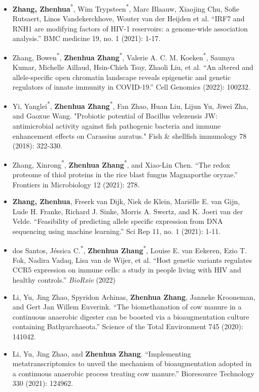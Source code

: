 \documentclass[10pt,A4,english]{article}
\begin{document}
\begin{paracol}{2}
\begin{rightcolumn}
\begin{itemize}[leftmargin=*]
  \item \textbf{Zhang, Zhenhua}\textsuperscript{*}, Wim Trypsteen\textsuperscript{*}, Marc Blaauw, Xiaojing Chu, Sofie Rutsaert, Linos Vandekerckhove, Wouter van der Heijden et al. \enquote{IRF7 and RNH1 are modifying factors of HIV-1 reservoirs: a genome-wide association analysis.} BMC medicine 19, no. 1 (2021): 1-17.
  \item Zhang, Bowen\textsuperscript{*}, \textbf{Zhenhua Zhang}\textsuperscript{*}, Valerie A. C. M. Koeken\textsuperscript{*}, Saumya Kumar, Michelle Aillaud, Hsin-Chieh Tsay, Zhaoli Liu, et al. \enquote{An altered and allele-specific open chromatin landscape reveals epigenetic and genetic regulators of innate immunity in COVID-19.} Cell Genomics (2022): 100232.
  \item Yi, Yanglei\textsuperscript{*}, \textbf{Zhenhua Zhang}\textsuperscript{*}, Fan Zhao, Huan Liu, Lijun Yu, Jiwei Zha, and Gaoxue Wang. "Probiotic potential of Bacillus velezensis JW: antimicrobial activity against fish pathogenic bacteria and immune enhancement effects on Carassius auratus." Fish \& shellfish immunology 78 (2018): 322-330.
  \item Zhang, Xinrong\textsuperscript{*}, \textbf{Zhenhua Zhang}\textsuperscript{*}, and Xiao-Lin Chen. \enquote{The redox proteome of thiol proteins in the rice blast fungus Magnaporthe oryzae.} Frontiers in Microbiology 12 (2021): 278.
  \item \textbf{Zhang, Zhenhua}, Freerk van Dijk, Niek de Klein, Mariëlle E. van Gijn, Lude H. Franke, Richard J. Sinke, Morris A. Swertz, and K. Joeri van der Velde. \enquote{Feasibility of predicting allele specific expression from DNA sequencing using machine learning.} Sci Rep 11, no. 1 (2021): 1-11.
  \item dos Santos, Jéssica C.\textsuperscript{*}, \textbf{Zhenhua Zhang}\textsuperscript{*}, Louise E. van Eekeren, Ezio T. Fok, Nadira Vadaq, Lisa van de Wijer, et al. \enquote{Host genetic variants regulates CCR5 expression on immune cells: a study in people living with HIV and healthy controls.} \textit{BioRxiv} (2022)
  \item Li, Yu, Jing Zhao, Spyridon Achinas, \textbf{Zhenhua Zhang}, Janneke Krooneman, and Gert Jan Willem Euverink. \enquote{The biomethanation of cow manure in a continuous anaerobic digester can be boosted via a bioaugmentation culture containing Bathyarchaeota.} Science of the Total Environment 745 (2020): 141042.
  \item Li, Yu, Jing Zhao, and \textbf{Zhenhua Zhang}. \enquote{Implementing metatranscriptomics to unveil the mechanism of bioaugmentation adopted in a continuous anaerobic process treating cow manure.} Bioresource Technology 330 (2021): 124962.

\end{itemize}
\end{rightcolumn}
\end{paracol}
\end{document}
